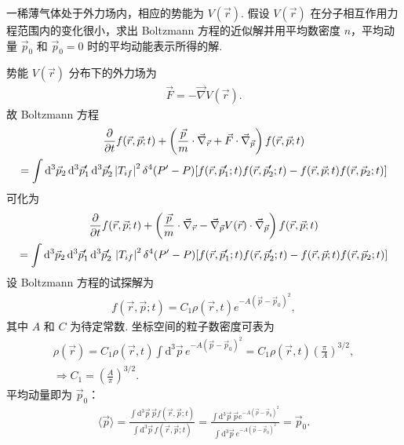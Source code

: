 \documentclass{assignment}
\begin{document}
\begin{prob}
    一稀薄气体处于外力场内，相应的势能为 $V(\vec{r})$. 假设 $V(\vec{r})$ 在分子相互作用力程范围内的变化很小，求出 Boltzmann 方程的近似解并用平均数密度 $n$，平均动量 $\vec{p}_0$ 和 $\vec{p}_0=0$ 时的平均动能表示所得的解.
\end{prob}
\begin{sol}
    势能 $V(\vec{r})$ 分布下的外力场为
    \begin{align}
        \vec{F}=-\vec{\nabla}V(\vec{r}).
    \end{align}
    故 Boltzmann 方程
    \begin{gather}
        \notag\frac{\partial}{\partial t}f(\vec{r},\vec{p};t)+\left(\frac{\vec{p}}{m}\cdot\vec{\nabla}_{\vec{r}}+\vec{F}\cdot\vec{\nabla}_{\vec{p}}\right)f(\vec{r},\vec{p};t)\\
        =\int\mathrm{d}^3\vec{p}_2\,\mathrm{d}^3\vec{p}_1'\,\mathrm{d}^3\vec{p}_2'\left\lvert T_{if}\right\rvert^2\delta^4(P'-P)[f(\vec{r},\vec{p}_1';t)f(\vec{r},\vec{p}_2';t)-f(\vec{r},\vec{p};t)f(\vec{r},\vec{p}_2;t)]
    \end{gather}
    可化为
    \begin{gather}
        \notag\frac{\partial}{\partial t}f(\vec{r},\vec{p};t)+\left(\frac{\vec{p}}{m}\cdot\vec{\nabla}_{\vec{r}}-\vec{\nabla}_{\vec{p}}V(\vec{r})\cdot\vec{\nabla}_{\vec{p}}\right)f(\vec{r},\vec{p};t)\\
        =\int\mathrm{d}^3\vec{p}_2\,\mathrm{d}^3\vec{p}_1'\,\mathrm{d}^3\vec{p}_2'\,\left\lvert T_{if}\right\rvert^2\delta^4(P'-P)[f(\vec{r},\vec{p}_1';t)f(\vec{r},\vec{p}_2';t)-f(\vec{r},\vec{p};t)f(\vec{r},\vec{p}_2;t)]
    \end{gather}
    设 Boltzmann 方程的试探解为
    \begin{align}
        f(\vec{r},\vec{p};t)=C_1\rho(\vec{r},t)e^{-A(\vec{p}-\vec{p}_0)^2},
    \end{align}
    其中 $A$ 和 $C$ 为待定常数.
    坐标空间的粒子数密度可表为
    \begin{gather}
        \rho(\vec{r})=C_1\rho(\vec{r},t)\int\mathrm{d}^3\vec{p}\,e^{-A(\vec{p}-\vec{p}_0)^2}=C_1\rho(\vec{r},t)\left(\frac{\pi}{A}\right)^{3/2},\\
        \Longrightarrow C_1=\left(\frac{A}{\pi}\right)^{3/2}.
    \end{gather}
    平均动量即为 $\vec{p}_0$：
    \begin{align}
        \langle\vec{p}\rangle=\frac{\int\mathrm{d}^3\vec{p}\,\vec{p}f(\vec{r},\vec{p};t)}{\int\mathrm{d}^3\vec{p}\,f(\vec{r},\vec{p};t)}=\frac{\int\mathrm{d}^3\vec{p}\,\vec{p}e^{-A(\vec{p}-\vec{p}_0)^2}}{\int\mathrm{d}^3\vec{p}\,e^{-A(\vec{p}-\vec{p}_0)^2}}=\vec{p}_0.

\end{align}
\end{sol}
\end{document}
